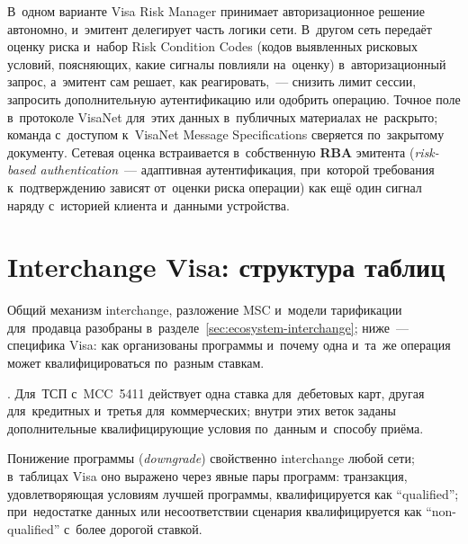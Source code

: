 В~одном варианте Visa Risk Manager принимает авторизационное решение автономно,
и~эмитент делегирует часть логики сети. В~другом сеть передаёт оценку риска
и~набор Risk Condition Codes (кодов выявленных рисковых условий, поясняющих, какие
сигналы повлияли на~оценку) в~авторизационный запрос, а~эмитент сам решает, как
реагировать,~--- снизить лимит сессии, запросить дополнительную аутентификацию
или одобрить операцию. Точное поле в~протоколе VisaNet для~этих данных
в~публичных материалах не~раскрыто; команда с~доступом к~VisaNet Message
Specifications сверяется по~закрытому документу. Сетевая оценка встраивается
в~собственную \textbf{RBA} эмитента (\textit{risk-based authentication}~---
  адаптивная аутентификация, при~которой требования к~подтверждению зависят
от~оценки риска операции) как ещё один сигнал наряду с~историей клиента
и~данными устройства.

\section{Interchange Visa: структура таблиц}\label{sec:visa-interchange}

Общий механизм interchange, разложение MSC и~модели тарификации для~продавца
разобраны в~разделе~\ref{sec:ecosystem-interchange}; ниже~--- специфика Visa:
как организованы программы и~почему одна и~та~же операция может
квалифицироваться по~разным ставкам.

. Для~ТСП с~MCC~5411 действует одна ставка
для~дебетовых карт, другая для~кредитных и~третья для~коммерческих; внутри этих веток заданы
дополнительные квалифицирующие условия по~данным и~способу приёма.

Понижение программы (\emph{downgrade}) свойственно interchange любой сети;
в~таблицах Visa оно выражено через явные пары программ: транзакция, удовлетворяющая условиям лучшей
программы, квалифицируется как \enquote{qualified}; при~недостатке данных или
несоответствии сценария квалифицируется как \enquote{non-qualified} с~более
дорогой ставкой.

